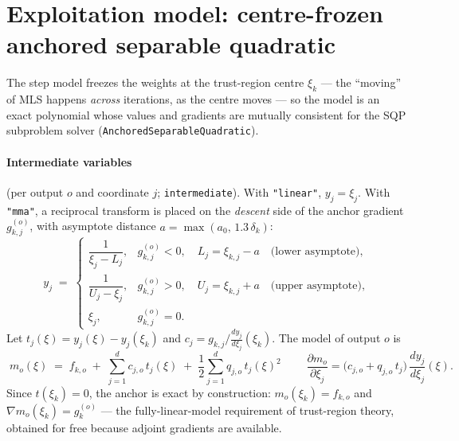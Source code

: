 \documentclass[11pt,a4paper]{article}
\newcommand{\code}[1]{\texttt{#1}}
\newcommand{\xxi}{\xi}
\begin{document}
\section{Exploitation model: centre-frozen anchored separable quadratic}
\label{sec:anchored}
The step model freezes the weights at the trust-region centre $\xxi_k$ ---
the ``moving'' of MLS happens \emph{across} iterations, as the centre moves
--- so the model is an exact polynomial whose values and gradients are
mutually consistent for the SQP subproblem solver
(\code{AnchoredSeparableQuadratic}).

\paragraph{Intermediate variables} (per output $o$ and coordinate $j$;
\code{intermediate}). With \code{"linear"}, $y_j = \xxi_j$. With
\code{"mma"}, a reciprocal transform is placed on the \emph{descent} side of
the anchor gradient $g^{(o)}_{k,j}$, with asymptote distance
$a = \max(a_0,\, 1.3\,\delta_k)$:
\begin{equation}
y_j \;=\;
\begin{cases}
\dfrac{1}{\xxi_j - L_j}, & g^{(o)}_{k,j} < 0,\quad L_j = \xxi_{k,j} - a
\quad\text{(lower asymptote)},\\[8pt]
\dfrac{1}{U_j - \xxi_j}, & g^{(o)}_{k,j} > 0,\quad U_j = \xxi_{k,j} + a
\quad\text{(upper asymptote)},\\[8pt]
\xxi_j, & g^{(o)}_{k,j} = 0 .
\end{cases}
\end{equation}
Let $t_j(\xxi) = y_j(\xxi) - y_j(\xxi_k)$ and
$c_j = g_{k,j} \bigl/ \tfrac{dy_j}{d\xxi_j}(\xxi_k)$. The model of output
$o$ is
\begin{equation}
\boxed{\;
m_o(\xxi) \;=\; f_{k,o} \;+\; \sum_{j=1}^{d} c_{j,o}\, t_j(\xxi)
\;+\; \frac12 \sum_{j=1}^{d} q_{j,o}\, t_j(\xxi)^2
\;}
\qquad
\frac{\partial m_o}{\partial \xxi_j}
= \bigl(c_{j,o} + q_{j,o}\, t_j\bigr)\,\frac{dy_j}{d\xxi_j}(\xxi).
\label{eq:model}
\end{equation}
Since $t(\xxi_k)=0$, the anchor is exact by construction:
$m_o(\xxi_k) = f_{k,o}$ and $\nabla m_o(\xxi_k) = g^{(o)}_k$ --- the
fully-linear-model requirement of trust-region theory, obtained for free
because adjoint gradients are available.
\end{document}
